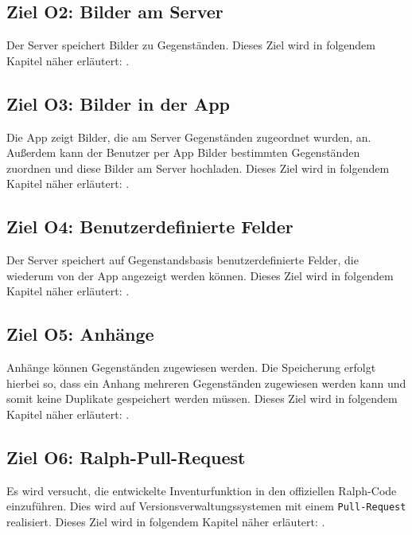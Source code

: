 \documentclass[
    headings=optiontotocandhead,%
    twoside,
    numbers=noenddot,%
    toc=flat, %
    12pt, %
    titlepage, %
    parskip=full, %
    listof=totoc, %
    listof=flat, %
    numbers=noenddot, %
    bibliography=totoc, %
    a4paper,DIV=14,
    BCOR=15mm,
]{scrbook}
\begin{document}
  \subsection*{Ziel O2: Bilder am Server}
  Der Server speichert Bilder zu Gegenständen.  
  Dieses Ziel wird in folgendem Kapitel näher erläutert: .



  \subsection*{Ziel O3: Bilder in der App}

  Die App zeigt Bilder, die am Server Gegenständen zugeordnet wurden, an. Außerdem kann der Benutzer per App Bilder bestimmten Gegenständen zuordnen und diese Bilder am Server hochladen.
  Dieses Ziel wird in folgendem Kapitel näher erläutert: .




  \subsection*{Ziel O4: Benutzerdefinierte Felder}

  Der Server speichert auf Gegenstandsbasis benutzerdefinierte Felder, die wiederum von der App angezeigt werden können.
  Dieses Ziel wird in folgendem Kapitel näher erläutert: .



  \subsection*{Ziel O5: Anhänge}

  Anhänge können Gegenständen zugewiesen werden. Die Speicherung erfolgt hierbei so, dass ein Anhang mehreren Gegenständen zugewiesen werden kann und somit keine Duplikate gespeichert werden müssen.
  Dieses Ziel wird in folgendem Kapitel näher erläutert: .



  \subsection*{Ziel O6: Ralph-Pull-Request}

  Es wird versucht, die entwickelte Inventurfunktion in den offiziellen Ralph-Code einzuführen. Dies wird auf Versionsverwaltungssystemen mit einem \texttt{Pull-Request} realisiert.
  Dieses Ziel wird in folgendem Kapitel näher erläutert: .
\end{document}
